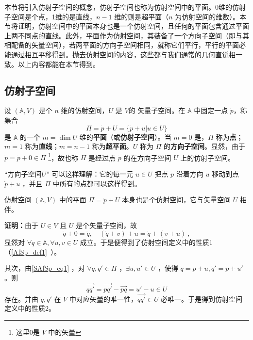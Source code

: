 
\begin{issues}
\end{issues}

本节将引入仿射子空间的概念，仿射子空间也称为仿射空间中的平面。0维的仿射子空间是个点，1维的是直线，$n-1$ 维的则是超平面（$n$ 为仿射空间的维数）。本节将证明，仿射空间中的平面本身也是一个仿射空间，且任何的平面包含通过平面上两不同点的直线。此外，平面作为仿射空间，其装备了一个方向子空间（即与其相配备的矢量空间），若两平面的方向子空间相同，就称它们平行，平行的平面必能通过相互平移得到。抛去仿射空间的内容，这些都与我们通常的几何直觉相一致。以上内容都能在本节得到。
\subsection{仿射子空间}
\begin{definition}{}\label{SAfSp_def1}
设 $(\mathbb A,V)$ 是个 $n$ 维的仿射空间，$U$ 是 $V$的 矢量子空间。在 $\mathbb A$ 中固定一点 $\dot p$，称集合
\begin{equation}\label{SAfSp_eq1}
\Pi=\dot p+U=\{\dot p+u|u\in U\}
\end{equation}
是 $\mathbb A$ 的一个 $m=\dim U$ 维的\textbf{平面}（或\textbf{仿射子空间}）。当 $m=0$ 是，$\Pi$ 称为\textbf{点}；$m=1$ 称为\textbf{直线}；$m=n-1$ 称为\textbf{超平面}。$U$ 称为 $\Pi$ 的\textbf{方向子空间}。显然，由于 $\dot p=\dot p+0\in \Pi$ \footnote{这里0是 $V$ 中的矢量}，故也称 $\Pi$ 是经过点 $\dot p$ 的在方向子空间 $U$ 上的仿射子空间。
\end{definition}
“方向子空间$U$” 可以这样理解：它的每一元 $u\in U$ 把点 $\dot p$ 沿着方向 $u$ 移动到点 $\dot p+u$ ，并且 $\Pi$ 中所有的点都可以这样得到。

\begin{theorem}{}
仿射空间 $(\mathbb A,V)$ 中的平面 $\Pi=\dot p+U$ 本身也是个仿射空间，它与矢量空间 $U$ 相伴。
\end{theorem}
\textbf{证明：}由于 $U\in V$ 且 $U$ 是个矢量子空间，故
\begin{equation}
\dot q+0=\dot q,\quad (\dot q+v)+u=\dot q+(v+u)~,
\end{equation}
显然对 $\forall \dot q\in\mathbb A,\forall u,v\in U$ 成立。于是便得到了仿射空间定义中的性质1（\autoref{AfSp_def1}~）。

其次，由\autoref{SAfSp_eq1} ，对 $\forall \dot q,\dot q'\in\Pi$ ，$\exists u,u'\in U$ ，使得 $\dot q=\dot p+u,\dot q'=\dot p+u'$。则
\begin{equation}
\overrightarrow{qq'}=\overrightarrow{pq'}-\overrightarrow{pq}=u'-u\in U
\end{equation}
存在。并由 $\dot q,\dot q'$ 在 $V$ 中对应矢量的唯一性，$\overrightarrow{qq'}\in U$ 必唯一。于是得到仿射空间定义中的性质2。


